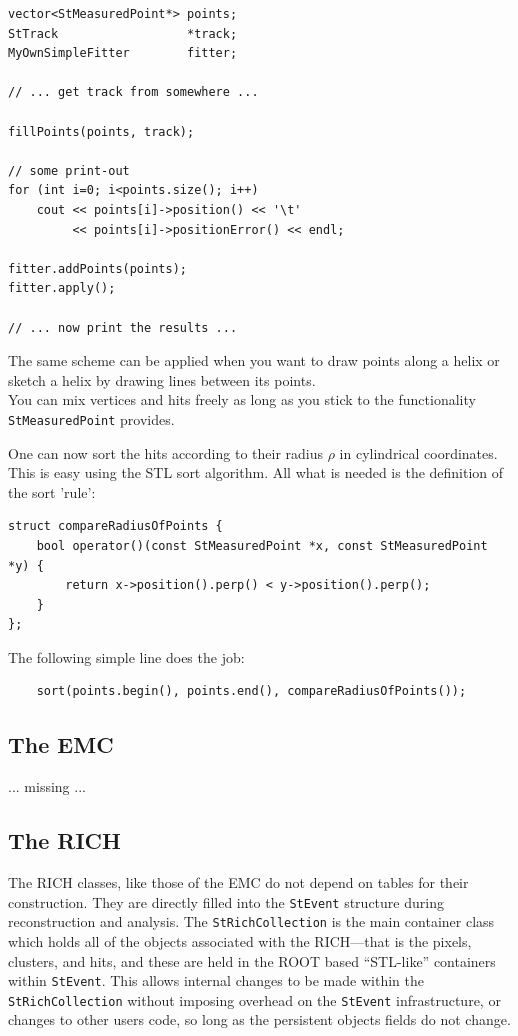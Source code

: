 \documentclass[twoside]{article}
\begin{document}
\begin{verbatim}
vector<StMeasuredPoint*> points;
StTrack                  *track;
MyOwnSimpleFitter        fitter;

// ... get track from somewhere ...

fillPoints(points, track);

// some print-out
for (int i=0; i<points.size(); i++)
    cout << points[i]->position() << '\t'
         << points[i]->positionError() << endl;

fitter.addPoints(points);
fitter.apply();

// ... now print the results ...
\end{verbatim}

The same scheme can be applied when you want to draw points along a helix
or sketch a helix by drawing lines between its points.\\
You can mix vertices and hits freely as long as you stick to the functionality
\texttt{StMeasuredPoint} provides.

One can now sort the hits according to their radius $\rho$ in cylindrical
coordinates. This is easy using the STL sort algorithm. All what is
needed is the definition of the sort 'rule': 
\begin{verbatim}
struct compareRadiusOfPoints {
    bool operator()(const StMeasuredPoint *x, const StMeasuredPoint *y) {
        return x->position().perp() < y->position().perp();
    }
};
\end{verbatim}
The following simple line does the job:
\begin{verbatim}
    sort(points.begin(), points.end(), compareRadiusOfPoints());
\end{verbatim}
\vfill
\subsection{The EMC}
... missing ...

\subsection{The RICH}
The RICH classes, like those of the EMC do not depend on
tables for their construction.  They are directly filled
into the \texttt{StEvent} structure during reconstruction and
analysis.  The \texttt{StRichCollection} is the main container class
which holds all of the objects associated with the RICH---that
is the pixels, clusters, and hits, and these are held in the
ROOT based ``STL-like'' containers within \texttt{StEvent}.
This allows internal changes to be made within the \texttt{StRichCollection}
without imposing overhead on the \texttt{StEvent} infrastructure,
or changes to other users code, so long as the persistent objects
fields do not change.
\end{document}
